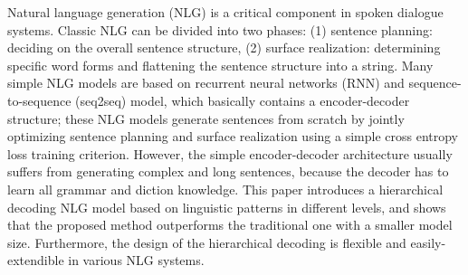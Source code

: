 Natural language generation (NLG) is a critical component in spoken dialogue systems. Classic NLG can be divided into two phases: (1) sentence planning: deciding on the overall sentence structure, (2) surface realization: determining specific word forms and flattening the sentence structure into a string. Many simple NLG models are based on recurrent neural networks (RNN) and sequence-to-sequence (seq2seq) model, which basically contains a encoder-decoder structure; these NLG models generate sentences from scratch by jointly optimizing sentence planning and surface realization using a simple cross entropy loss training criterion. However, the simple encoder-decoder architecture usually suffers from generating complex and long sentences, because the decoder has to learn all grammar and diction knowledge. This paper introduces a hierarchical decoding NLG model based on linguistic patterns in different levels, and shows that the proposed method outperforms the traditional one with a smaller model size. Furthermore, the design of the hierarchical decoding is flexible and easily-extendible in various NLG systems.
